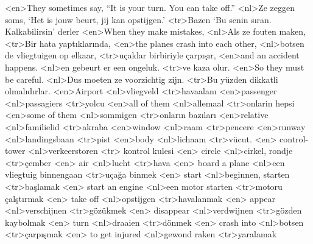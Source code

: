 <en>They sometimes say, “It is your turn. You can take off.”
<nl>Ze zeggen soms, `Het is jouw beurt, jij kan opstijgen.'
<tr>Bazen ‘Bu senin sıran. Kalkabilirsin’ derler
<en>When they make mistakes,
<nl>Als ze fouten maken, 
<tr>Bir hata yaptıklarında,
<en>the planes crash into each other,
<nl>botsen de vliegtuigen op elkaar,
<tr>uçaklar birbiriyle çarpışır,
<en>and an accident happens.
<nl>en gebeurt er een ongeluk.
<tr>ve kaza olur.
<en>So they must be careful.
<nl>Dus moeten ze voorzichtig zijn.
<tr>Bu yüzden dikkatli olmalıdırlar.
<en>Airport
<nl>vliegveld
<tr>havaalanı
<en>passenger
<nl>passagiers
<tr>yolcu
<en>all of them
<nl>allemaal
<tr>onlarin hepsi
<en>some of them 
<nl>sommigen  
<tr>onların bazıları
<en>relative  
<nl>familielid  
<tr>akraba
<en>window  
<nl>raam  
<tr>pencere
<en>runway  
<nl>landingsbaan  
<tr>pist
<en>body 
<nl>lichaam  
<tr>vücut.
<en> control-tower  
<nl>verkeerstoren 
<tr> kontrol kulesi
<en> circle 
<nl>cirkel, rondje 
<tr>çember
<en> air 
<nl>lucht 
<tr>hava
<en> board a plane  
<nl>een vliegtuig binnengaan 
<tr>uçağa binmek
<en> start 
<nl>beginnen, starten 
<tr>başlamak
<en> start an engine 
<nl>een motor starten 
<tr>motoru çalştırmak
<en> take off 
<nl>opstijgen 
<tr>havalanmak
<en> appear 
<nl>verschijnen 
<tr>gözükmek
<en> disappear 
<nl>verdwijnen 
<tr>gözden kaybolmak
<en> turn 
<nl>draaien 
<tr>dönmek
<en> crash into 
<nl>botsen 
<tr>çarpışmak
<en> to get injured 
<nl>gewond raken 
<tr>yaralamak
